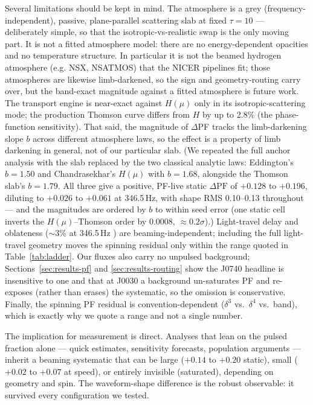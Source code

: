 \documentclass[twocolumn]{aastex701}
\begin{document}
Several limitations should be kept in mind. The atmosphere is a grey
(frequency-independent), passive, plane-parallel scattering slab at fixed $\tau = 10$ ---
deliberately simple, so that the isotropic-vs-realistic swap is the only moving part. It is
not a fitted atmosphere model: there are no energy-dependent opacities and no temperature
structure. In particular it is not the beamed hydrogen atmosphere (e.g. NSX, NSATMOS) that
the NICER pipelines fit; those atmospheres are likewise limb-darkened, so the sign and
geometry-routing carry over, but the band-exact magnitude against a fitted atmosphere is
future work. The transport engine is near-exact against $H(\mu)$ only in its
isotropic-scattering mode; the production Thomson curve differs from $H$ by up to 2.8\% (the
phase-function sensitivity). That said, the magnitude of $\Delta$PF tracks the
limb-darkening slope $b$ across different atmosphere laws, so the effect is a property of
limb darkening in general, not of our particular slab. (We repeated the full anchor analysis
with the slab replaced by the two classical analytic laws: Eddington's $b = 1.50$ and
Chandrasekhar's $H(\mu)$ with $b = 1.68$, alongside the Thomson slab's $b = 1.79$. All three
give a positive, PF-live static $\Delta\mathrm{PF}$ of $+0.128$ to $+0.196$, diluting to
$+0.026$ to $+0.061$ at 346.5\,Hz, with shape RMS 0.10--0.13 throughout --- and the
magnitudes are ordered by $b$ to within seed error (one static cell inverts
the $H(\mu)$--Thomson order by $0.0008$, $\approx 0.2\sigma$).) Light-travel delay \citep{Poutanen2020} and oblateness
($\sim$3\% at 346.5\,Hz \citealp{AlGendyMorsink2014}) are beaming-independent; including the
full light-travel geometry moves the spinning residual only within the range quoted in
Table~\ref{tab:ladder}. Our fluxes also carry no unpulsed background;
Sections~\ref{sec:results-pf} and \ref{sec:results-routing} show the J0740 headline is
insensitive to one and that at J0030 a background un-saturates PF and re-exposes (rather
than erases) the systematic, so the omission is conservative. Finally, the spinning PF
residual is convention-dependent ($\delta^3$ vs.\ $\delta^4$ vs.\ band), which is exactly
why we quote a range and not a single number.

The implication for measurement is direct. Analyses that lean on the pulsed fraction alone
--- quick estimates, sensitivity forecasts, population arguments
\citep[e.g.][]{AnnalaPoutanen2010,Psaltis2014,Sotani2018} --- inherit a beaming systematic
that can be large ($+0.14$ to $+0.20$ static), small ($+0.02$ to $+0.07$ at speed), or
entirely invisible (saturated), depending on geometry and spin. The waveform-shape
difference is the robust observable: it survived every configuration we tested.
\end{document}

